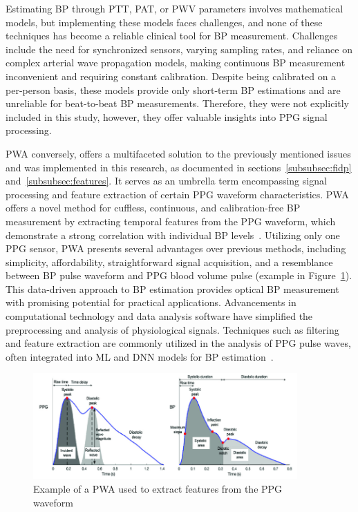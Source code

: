 \vspace{-1cm}
Estimating BP through PTT, PAT, or PWV parameters involves mathematical models, but implementing these models faces challenges, and none of these techniques has become a reliable clinical tool for BP measurement.
Challenges include the need for synchronized sensors, varying sampling rates, and reliance on complex arterial wave propagation models, making continuous BP measurement inconvenient and requiring constant calibration.
Despite being calibrated on a per-person basis, these models provide only short-term BP estimations and are unreliable for beat-to-beat BP measurements.
Therefore, they were not explicitly included in this study, however, they offer valuable insights into PPG signal processing.

\ac{PWA} conversely, offers a multifaceted solution to the previously mentioned issues and was implemented in this research, as documented in sections~\ref{subsubsec:fidp} and~\ref{subsubsec:features}.
It serves as an umbrella term encompassing signal processing and feature extraction of certain PPG waveform characteristics.
PWA offers a novel method for cuffless, continuous, and calibration-free BP measurement by extracting temporal features from the PPG waveform, which demonstrate a strong correlation with individual BP levels~\cite{elgendiAnalysisFingertipPhotoplethysmogram2012}.
Utilizing only one PPG sensor, PWA presents several advantages over previous methods, including simplicity, affordability, straightforward signal acquisition, and a resemblance between BP pulse waveform and PPG blood volume pulse (example in Figure~\ref{fig:pwa}).
This data-driven approach to BP estimation provides optical BP measurement with promising potential for practical applications.
Advancements in computational technology and data analysis software have simplified the preprocessing and analysis of physiological signals.
Techniques such as filtering and feature extraction are commonly utilized in the analysis of PPG pulse waves, often integrated into ML and \ac{DNN} models for BP estimation~\cite{mahardikatPPGSignalsBasedBloodPressure2023}.

\begin{figure}[h]
    \includegraphics[width=0.9\textwidth]{images/sp/pwa}
    \caption{Example of a PWA used to extract features from the PPG waveform~\cite{bikiaLeveragingPotentialMachine2021}}
    \label{fig:pwa}
\end{figure}

